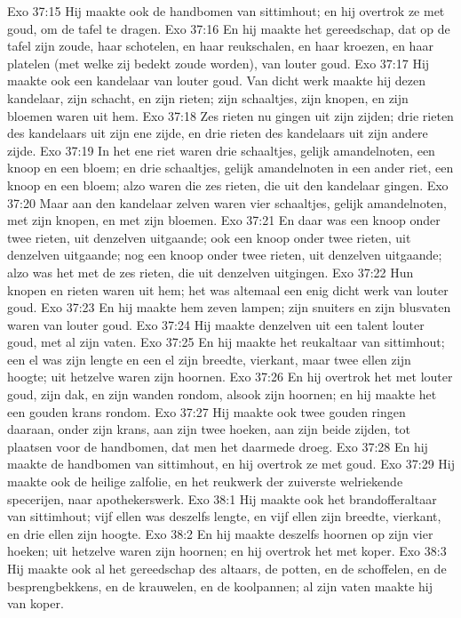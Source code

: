 Exo 37:15  Hij maakte ook de handbomen van sittimhout; en hij overtrok ze met goud, om de tafel te dragen.
Exo 37:16  En hij maakte het gereedschap, dat op de tafel zijn zoude, haar schotelen, en haar reukschalen, en haar kroezen, en haar platelen (met welke zij bedekt zoude worden), van louter goud.
Exo 37:17  Hij maakte ook een kandelaar van louter goud. Van dicht werk maakte hij dezen kandelaar, zijn schacht, en zijn rieten; zijn schaaltjes, zijn knopen, en zijn bloemen waren uit hem.
Exo 37:18  Zes rieten nu gingen uit zijn zijden; drie rieten des kandelaars uit zijn ene zijde, en drie rieten des kandelaars uit zijn andere zijde.
Exo 37:19  In het ene riet waren drie schaaltjes, gelijk amandelnoten, een knoop en een bloem; en drie schaaltjes, gelijk amandelnoten in een ander riet, een knoop en een bloem; alzo waren die zes rieten, die uit den kandelaar gingen.
Exo 37:20  Maar aan den kandelaar zelven waren vier schaaltjes, gelijk amandelnoten, met zijn knopen, en met zijn bloemen.
Exo 37:21  En daar was een knoop onder twee rieten, uit denzelven uitgaande; ook een knoop onder twee rieten, uit denzelven uitgaande; nog een knoop onder twee rieten, uit denzelven uitgaande; alzo was het met de zes rieten, die uit denzelven uitgingen.
Exo 37:22  Hun knopen en rieten waren uit hem; het was altemaal een enig dicht werk van louter goud.
Exo 37:23  En hij maakte hem zeven lampen; zijn snuiters en zijn blusvaten waren van louter goud.
Exo 37:24  Hij maakte denzelven uit een talent louter goud, met al zijn vaten.
Exo 37:25  En hij maakte het reukaltaar van sittimhout; een el was zijn lengte en een el zijn breedte, vierkant, maar twee ellen zijn hoogte; uit hetzelve waren zijn hoornen.
Exo 37:26  En hij overtrok het met louter goud, zijn dak, en zijn wanden rondom, alsook zijn hoornen; en hij maakte het een gouden krans rondom.
Exo 37:27  Hij maakte ook twee gouden ringen daaraan, onder zijn krans, aan zijn twee hoeken, aan zijn beide zijden, tot plaatsen voor de handbomen, dat men het daarmede droeg.
Exo 37:28  En hij maakte de handbomen van sittimhout, en hij overtrok ze met goud.
Exo 37:29  Hij maakte ook de heilige zalfolie, en het reukwerk der zuiverste welriekende specerijen, naar apothekerswerk.
Exo 38:1  Hij maakte ook het brandofferaltaar van sittimhout; vijf ellen was deszelfs lengte, en vijf ellen zijn breedte, vierkant, en drie ellen zijn hoogte.
Exo 38:2  En hij maakte deszelfs hoornen op zijn vier hoeken; uit hetzelve waren zijn hoornen; en hij overtrok het met koper.
Exo 38:3  Hij maakte ook al het gereedschap des altaars, de potten, en de schoffelen, en de besprengbekkens, en de krauwelen, en de koolpannen; al zijn vaten maakte hij van koper.
